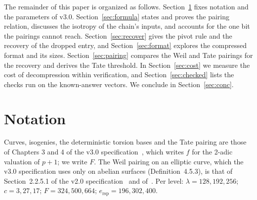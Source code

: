 \documentclass[version=submission]{iacrcc}
\newcommand{\ers}{e_{\mathrm{rsp}}}
\begin{document}
The remainder of this paper is organized as follows.
Section~\ref{sec:notation} fixes notation and the parameters of v3.0.
Section~\ref{sec:formula} states and proves the pairing relation, discusses the isotropy of the chain's inputs, and accounts for the one bit the pairings cannot reach.
Section~\ref{sec:recover} gives the pivot rule and the recovery of the dropped entry, and
Section~\ref{sec:format} explores the compressed format and its sizes.
Section~\ref{sec:pairing} compares the Weil and Tate pairings for the
recovery and derives the Tate threshold.
In Section~\ref{sec:cost} we measure
the cost of decompression within verification, and
Section~\ref{sec:checked} lists the checks run on the known-answer
vectors.
We conclude in Section~\ref{sec:conc}.

\section{Notation}
\label{sec:notation}

Curves, isogenies, the deterministic torsion bases and the Tate pairing
are those of Chapters 3 and 4 of the v3.0
specification~\cite{sqisign-spec-r3}, which writes $f$ for the 2-adic
valuation of $p + 1$; we write $F$. The Weil pairing on an elliptic curve,
which the v3.0 specification uses only on abelian surfaces
(Definition~4.5.3), is that of Section~2.2.5.1 of the v2.0
specification~\cite{sqisign-spec-r2} and of~\cite[III.8]{silverman}. Per
level: $\lambda = 128, 192, 256$; $c = 3, 27, 17$; $F = 324, 500, 664$;
$\ers = 196, 302, 400$.
\end{document}
